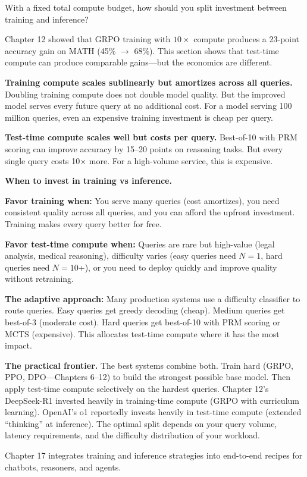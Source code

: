 \begin{chapterenv}
With a fixed total compute budget, how should you split investment between training and inference?

Chapter 12 showed that GRPO training with $10\times$ compute produces a 23-point accuracy gain on MATH (45\% $\to$ 68\%). This section shows that test-time compute can produce comparable gains---but the economics are different.

\textbf{Training compute scales sublinearly but amortizes across all queries.} Doubling training compute does not double model quality. But the improved model serves every future query at no additional cost. For a model serving 100 million queries, even an expensive training investment is cheap per query.

\textbf{Test-time compute scales well but costs per query.} Best-of-10 with PRM scoring can improve accuracy by 15--20 points on reasoning tasks. But every single query costs 10$\times$ more. For a high-volume service, this is expensive.

\begin{infobox}
\textbf{When to invest in training vs inference.}

\textbf{Favor training when:} You serve many queries (cost amortizes), you need consistent quality across all queries, and you can afford the upfront investment. Training makes every query better for free.

\textbf{Favor test-time compute when:} Queries are rare but high-value (legal analysis, medical reasoning), difficulty varies (easy queries need $N=1$, hard queries need $N=10$+), or you need to deploy quickly and improve quality without retraining.

\textbf{The adaptive approach:} Many production systems use a difficulty classifier to route queries. Easy queries get greedy decoding (cheap). Medium queries get best-of-3 (moderate cost). Hard queries get best-of-10 with PRM scoring or MCTS (expensive). This allocates test-time compute where it has the most impact.
\end{infobox}

\begin{tipbox}
\textbf{The practical frontier.} The best systems combine both. Train hard (GRPO, PPO, DPO---Chapters 6--12) to build the strongest possible base model. Then apply test-time compute selectively on the hardest queries. Chapter 12's DeepSeek-R1 invested heavily in training-time compute (GRPO with curriculum learning). OpenAI's o1 reportedly invests heavily in test-time compute (extended ``thinking'' at inference). The optimal split depends on your query volume, latency requirements, and the difficulty distribution of your workload.

Chapter 17 integrates training and inference strategies into end-to-end recipes for chatbots, reasoners, and agents.
\end{tipbox}

\end{chapterenv}